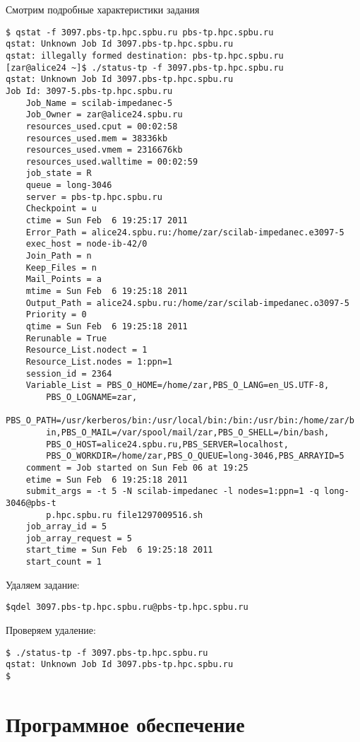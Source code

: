 \documentclass[a4paper,8pt]{extreport}
\newcounter{ex}
\begin{document}
Смотрим подробные  характеристики задания
\begin{lstlisting}
$ qstat -f 3097.pbs-tp.hpc.spbu.ru pbs-tp.hpc.spbu.ru
qstat: Unknown Job Id 3097.pbs-tp.hpc.spbu.ru
qstat: illegally formed destination: pbs-tp.hpc.spbu.ru
[zar@alice24 ~]$ ./status-tp -f 3097.pbs-tp.hpc.spbu.ru
qstat: Unknown Job Id 3097.pbs-tp.hpc.spbu.ru
Job Id: 3097-5.pbs-tp.hpc.spbu.ru
    Job_Name = scilab-impedanec-5
    Job_Owner = zar@alice24.spbu.ru
    resources_used.cput = 00:02:58
    resources_used.mem = 38336kb
    resources_used.vmem = 2316676kb
    resources_used.walltime = 00:02:59
    job_state = R
    queue = long-3046
    server = pbs-tp.hpc.spbu.ru
    Checkpoint = u
    ctime = Sun Feb  6 19:25:17 2011
    Error_Path = alice24.spbu.ru:/home/zar/scilab-impedanec.e3097-5
    exec_host = node-ib-42/0
    Join_Path = n
    Keep_Files = n
    Mail_Points = a
    mtime = Sun Feb  6 19:25:18 2011
    Output_Path = alice24.spbu.ru:/home/zar/scilab-impedanec.o3097-5
    Priority = 0
    qtime = Sun Feb  6 19:25:18 2011
    Rerunable = True
    Resource_List.nodect = 1
    Resource_List.nodes = 1:ppn=1
    session_id = 2364
    Variable_List = PBS_O_HOME=/home/zar,PBS_O_LANG=en_US.UTF-8,
        PBS_O_LOGNAME=zar,
        PBS_O_PATH=/usr/kerberos/bin:/usr/local/bin:/bin:/usr/bin:/home/zar/b
        in,PBS_O_MAIL=/var/spool/mail/zar,PBS_O_SHELL=/bin/bash,
        PBS_O_HOST=alice24.spbu.ru,PBS_SERVER=localhost,
        PBS_O_WORKDIR=/home/zar,PBS_O_QUEUE=long-3046,PBS_ARRAYID=5
    comment = Job started on Sun Feb 06 at 19:25
    etime = Sun Feb  6 19:25:18 2011
    submit_args = -t 5 -N scilab-impedanec -l nodes=1:ppn=1 -q long-3046@pbs-t
        p.hpc.spbu.ru file1297009516.sh
    job_array_id = 5
    job_array_request = 5
    start_time = Sun Feb  6 19:25:18 2011
    start_count = 1
\end{lstlisting}

Удаляем задание:
\begin{lstlisting}
$qdel 3097.pbs-tp.hpc.spbu.ru@pbs-tp.hpc.spbu.ru
\end{lstlisting}

Проверяем удаление:
\begin{lstlisting}
$ ./status-tp -f 3097.pbs-tp.hpc.spbu.ru
qstat: Unknown Job Id 3097.pbs-tp.hpc.spbu.ru
$
\end{lstlisting}


\section{Программное обеспечение}
\end{document}
